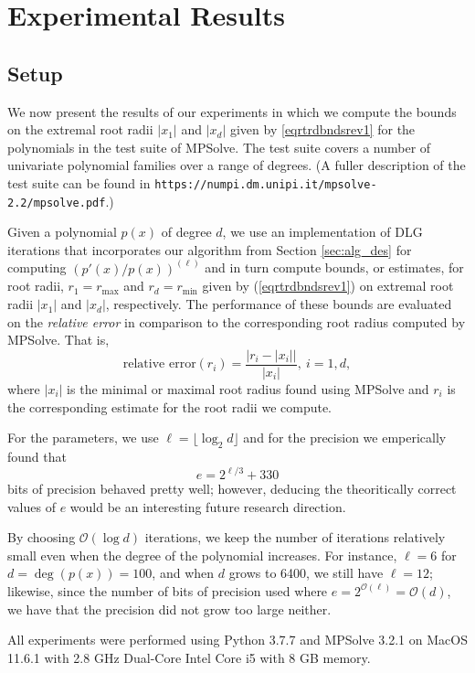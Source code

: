 \documentclass[runningheads]{llncs}
\begin{document}
\section{Experimental Results}
\subsection{Setup}
We now present the results of our experiments in which we compute the bounds on the extremal root radii $|x_1|$ and $|x_d|$ given by \ref{eqrtrdbndsrev1} for the polynomials in the test suite of MPSolve. The test suite covers a number of univariate polynomial families over a range of degrees. (A fuller description of the test suite can be found in \texttt{https://numpi.dm.unipi.it/mpsolve-2.2/mpsolve.pdf}.)

Given a polynomial $p(x)$ of degree $d$, we use an implementation of DLG iterations that incorporates our algorithm from Section \ref{sec:alg_des} for computing $(p'(x)/p(x))^{(\ell)}$ and in turn compute bounds, or estimates, for root radii, $r_1 = r_{\text{max}}$ and $r_d = r_{\text{min}}$ given by (\ref{eqrtrdbndsrev1}) on extremal root radii $|x_1|$ and $|x_d|$, respectively. The performance of these bounds are evaluated on the \emph{relative error} in comparison to the corresponding root radius computed by MPSolve. That is,
$$
\text{relative error}(r_i) = \frac{\big|r_i - |x_i|\big|}{|x_i|},~i = 1, d,
$$
where $|x_i|$ is the minimal or maximal root radius found using MPSolve and $r_i$ is the corresponding estimate for the root radii we compute.

For the parameters, we use $\ell = \lfloor \log_2 d \rfloor$ and for the precision we emperically found that
\begin{equation*}
e =  2^{\ell/3} + 330
\end{equation*}
bits of precision behaved pretty well; however, deducing the theoritically correct values of $e$ would be an interesting future research direction.

By choosing $\mathcal{O}(\log d)$ iterations, we keep the number of iterations relatively small even when the degree of the polynomial increases. For instance, $\ell = 6$ for $d = \deg(p(x)) = 100$, and when $d$ grows to 6400, we still have $\ell = 12$; likewise, since the number of bits of precision used where $e = 2^{\mathcal{O}(\ell)} = \mathcal{O}(d)$, we have that the precision did not grow too large neither.

All experiments were performed using Python 3.7.7 and MPSolve 3.2.1 on MacOS 11.6.1 with 2.8 GHz Dual-Core Intel Core i5 with 8 GB memory.
\end{document}
